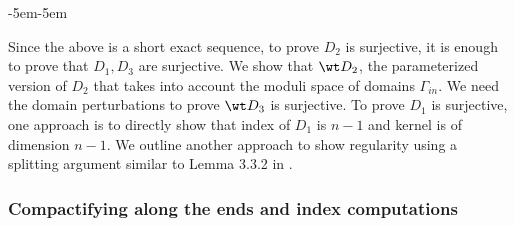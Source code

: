 \begin{adjustwidth*}{-5em}{-5em} 

\end{adjustwidth*}

    
\noindent Since the above is a short exact sequence, to prove $D_2$ is surjective, it is enough to prove that $D_1 , D_3$ are surjective. We show that $\wt D_2$, the parameterized version of $D_2$ that takes into account the moduli space of domains $\Gamma_{in}$. We need the domain perturbations to prove $\wt D_3$ is surjective. To prove $D_1$ is surjective, one approach is to directly show that index of $D_1$ is $n-1$ and kernel is of dimension $n-1$. We outline another approach to show regularity using a splitting argument similar to Lemma 3.3.2 in \cite{jholobook}. 


\subsubsection{Compactifying along the ends and index computations} 

